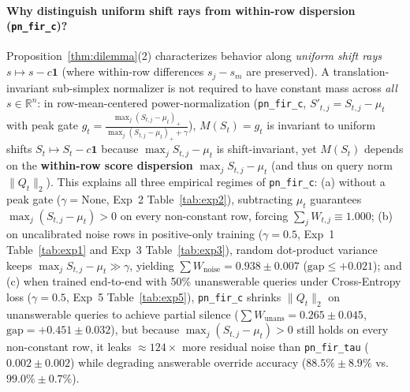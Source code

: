 \documentclass[11pt,a4paper]{article}
\begin{document}
\paragraph{Why distinguish uniform shift rays from within-row dispersion (\texttt{pn\_fir\_c})?} Proposition~\ref{thm:dilemma}(2) characterizes behavior along \emph{uniform shift rays} $s \mapsto s - c\mathbf{1}$ (where within-row differences $s_j - s_m$ are preserved). A translation-invariant sub-simplex normalizer is not required to have constant mass across \emph{all} $s \in \mathbb{R}^n$: in row-mean-centered power-normalization (\texttt{pn\_fir\_c}, $S'_{t,j} = S_{t,j} - \mu_t$ with peak gate $g_t = \frac{\max_j (S_{t,j} - \mu_t)_+}{\max_j (S_{t,j} - \mu_t)_+ + \gamma}$), $M(S_t) = g_t$ is invariant to uniform shifts $S_t \mapsto S_t - c\mathbf{1}$ because $\max_j S_{t,j} - \mu_t$ is shift-invariant, yet $M(S_t)$ depends on the \textbf{within-row score dispersion} $\max_j S_{t,j} - \mu_t$ (and thus on query norm $\|Q_t\|_2$). This explains all three empirical regimes of \texttt{pn\_fir\_c}: (a) without a peak gate ($\gamma = \text{None}$, Exp~2 Table~\ref{tab:exp2}), subtracting $\mu_t$ guarantees $\max_j(S_{t,j} - \mu_t) > 0$ on every non-constant row, forcing $\sum_j W_{t,j} \equiv 1.000$; (b) on uncalibrated noise rows in positive-only training ($\gamma = 0.5$, Exp~1 Table~\ref{tab:exp1} and Exp~3 Table~\ref{tab:exp3}), random dot-product variance keeps $\max_j S_{t,j} - \mu_t \gg \gamma$, yielding $\sum W_{\text{noise}} = 0.938 \pm 0.007$ ($\text{gap} \le +0.021$); and (c) when trained end-to-end with 50\% unanswerable queries under Cross-Entropy loss ($\gamma = 0.5$, Exp~5 Table~\ref{tab:exp5}), \texttt{pn\_fir\_c} shrinks $\|Q_t\|_2$ on unanswerable queries to achieve partial silence ($\sum W_{\text{unans}} = 0.265 \pm 0.045$, $\text{gap} = +0.451 \pm 0.032$), but because $\max_j(S_{t,j} - \mu_t) > 0$ still holds on every non-constant row, it leaks $\approx 124\times$ more residual noise than \texttt{pn\_fir\_tau} ($0.002 \pm 0.002$) while degrading answerable override accuracy ($88.5\% \pm 8.9\%$ vs.\ $99.0\% \pm 0.7\%$).
\end{document}
